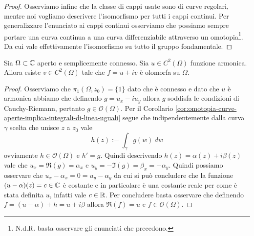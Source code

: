 \begin{proof}
    Osserviamo infine che la classe di cappi usate sono di curve regolari, 
    mentre noi vogliamo descrivere l'isomorfismo per tutti i cappi continui. 
    Per generalizzare l'enunciato ai cappi continui osserviamo che possiamo 
    sempre portare una curva continua a una curva differenziabile attraverso
    un omotopia\footnote{N.d.R. basta osservare gli enunciati che precedono.}.
    Da cui vale effettivamente l'isomorfismo su tutto il gruppo fondamentale.
\end{proof}

\begin{theorem}
  Sia $\Omega \subset \mathbb{C}$ aperto e semplicemente connesso. Sia $u \in
  C^2(\Omega)$ funzione armonica. Allora esiste $v \in C^2(\Omega)$ tale che
  $f = u + iv$ è olomorfa su $\Omega$.
  \label{thr:esistenza-armonica-congiunta}
\end{theorem}
\begin{proof}
    Osserviamo che $\pi_1(\Omega, z_0) = \{1\}$ dato che è connesso e dato che
    $u$ è armonica abbiamo che definendo $g = u_x - iu_y$ allora $g$ soddisfa le
    condizioni di Cauchy-Riemann, pertanto $g \in \mathcal{O}(\Omega)$. Per il
    Corollario \ref{cor:omotopia-curve-aperte-implica-integrali-di-linea-uguali}
    segue che indipendentemente dalla curva $\gamma$ scelta che unisce $z$
    a $z_0$ vale
    \begin{equation*}
        h(z) := \int_\gamma g(w)\ dw
    \end{equation*}
    ovviamente $h \in \mathcal{O}(\Omega)$ e $h' = g$.
    Quindi descrivendo $h(z) = \alpha(z) + i\beta(z)$ vale che $u_x = \Re(g)
    = \alpha_x$ e $u_y = -\Im(g) = \beta_x = -\alpha_y$. Quindi possiamo
    osservare che $u_x - \alpha_x = 0 = u_y - \alpha_y$ da cui si può
    concludere che la funzione $(u-\alpha)(z) = c \in \mathbb{C}$ è costante e in 
    particolare è una costante reale per come è stata definita $u$, infatti 
    vale $c \in \mathbb{R}$. Per concludere basta osservare che definendo 
    $f = (u - \alpha) + h = u + i\beta$ allora $\Re(f) = u$ e $f \in
    \mathcal{O}(\Omega)$.
\end{proof}


